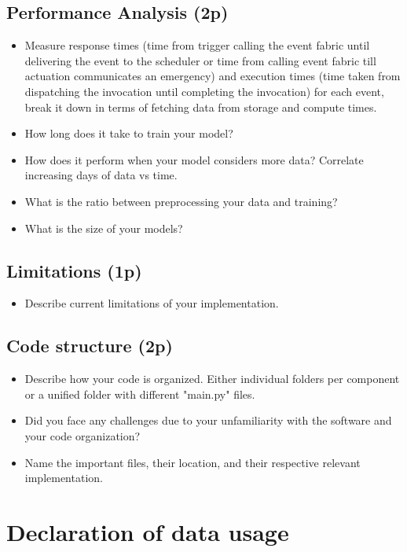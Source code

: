 \documentclass[A4,10pt]{article}
\begin{document}
\subsection{ Performance Analysis (2p)}

\begin{itemize}
	\item Measure response times (time from trigger calling the event fabric until delivering the event to the scheduler or time from calling event fabric till actuation communicates an emergency) and execution times (time taken from dispatching the invocation until completing the invocation) for each event, break it down in terms of fetching data from storage and compute times.
	\item How long does it take to train your model?
	\item How does it perform when your model considers more data? Correlate increasing days of data vs time.
	\item What is the ratio between preprocessing your data and training? 
	\item What is the size of your models?
\end{itemize}


\subsection{ Limitations (1p)}

\begin{itemize}
	\item Describe current limitations of your implementation.
\end{itemize}


\subsection{ Code structure (2p)}

\begin{itemize}
	\item Describe how your code is organized. Either individual folders per component or a unified folder with different "main.py" files.
	\item Did you face any challenges due to your unfamiliarity with the software and your code organization?
	\item Name the important files, their location, and their respective relevant implementation.
\end{itemize}


\section{Declaration of data usage}
\end{document}
